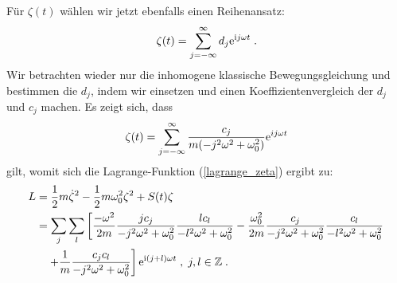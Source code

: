   Für $\zeta(t)$ wählen wir jetzt ebenfalls einen Reihenansatz:
  \begin{equation}
    \zeta(t) = \sum_{j=-\infty}^\infty d_j \text e^{\text ij\omega t} \; .
  \end{equation}
  Wir betrachten wieder nur die inhomogene klassische Bewegungsgleichung und bestimmen die $d_j$, indem wir einsetzen und einen Koeffizientenvergleich der $d_j$ und $c_j$ machen.
  Es zeigt sich, dass
  \begin{equation}
    \zeta(t) = \sum_{j=-\infty}^\infty \frac{c_j}{m(-j^2\omega^2+\omega_0^2)} \text e^{ij\omega t}
  \end{equation}
  gilt, womit sich die Lagrange-Funktion (\ref{lagrange_zeta}) ergibt zu:
  \begin{align}
    \begin{split}
      L &= \frac{1}{2}m\dot \zeta^2 - \frac{1}{2}m\omega_0^2\zeta^2 + S(t)\zeta \\
       &=\sum_j \sum_l \left[ \frac{-\omega^2}{2m} \frac{jc_j}{-j^2\omega^2+\omega_0^2} \frac{lc_l}{-l^2\omega^2+\omega_0^2}
       -\frac{\omega_0^2}{2m} \frac{c_j}{-j^2\omega^2+\omega_0^2} \frac{c_l}{-l^2\omega^2+\omega_0^2} \right. \\
        &\left. \quad + \frac{1}{m} \frac{c_jc_l}{-j^2\omega^2+\omega_0^2} \right] \text e^{\text i(j+l)\omega t}  \; , \; j,l \in \mathbb{Z} \; .
     \end{split}
   \end{align}
  \iffalse
  \begin{align}
    \begin{split}
      L &= \frac{1}{2}m\dot \zeta^2 - \frac{1}{2}m\omega_0^2\zeta^2 + S(t)\zeta \\
       &=\frac{-\omega^2}{2m} \sum_j \sum_l \frac{jc_j}{-j^2\omega^2+\omega_0^2} \frac{lc_l}{-l^2\omega^2+\omega_0^2} \text e^{\text i(j+l)\omega t}\\
       &\quad-\frac{\omega_0^2}{2m} \sum_j \sum_l \frac{c_j}{-j^2\omega^2+\omega_0^2} \frac{c_l}{-l^2\omega^2+\omega_0^2} \text e^{\text i(j+l)\omega t}\\
       &\quad + \frac{1}{m} \sum_j \sum_l \frac{c_jc_l}{-j^2\omega^2+\omega_0^2} \text e^{\text i(j+l)\omega t}\; , \; j,l \in \mathbb{Z} \; .
     \end{split}
   \end{align}
   \fi

